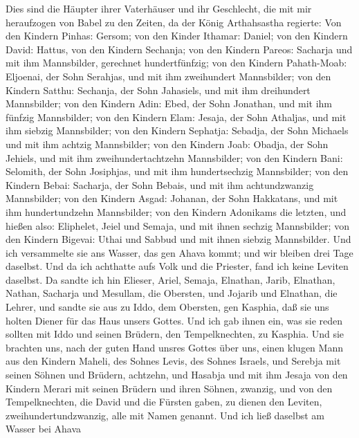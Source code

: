  Dies sind die Häupter ihrer Vaterhäuser und ihr Geschlecht,
die mit mir heraufzogen von Babel zu den Zeiten, da der König
Arthahsastha regierte:  Von den Kindern Pinhas: Gersom; von
den Kinder Ithamar: Daniel; von den Kindern David: Hattus, 
von den Kindern Sechanja; von den Kindern Pareos: Sacharja und mit ihm
Mannsbilder, gerechnet hundertfünfzig;  von den Kindern
Pahath-Moab: Eljoenai, der Sohn Serahjas, und mit ihm zweihundert
Mannsbilder;  von den Kindern Satthu: Sechanja, der Sohn
Jahasiels, und mit ihm dreihundert Mannsbilder;  von den
Kindern Adin: Ebed, der Sohn Jonathan, und mit ihm fünfzig Mannsbilder;
 von den Kindern Elam: Jesaja, der Sohn Athaljas, und mit
ihm siebzig Mannsbilder;  von den Kindern Sephatja: Sebadja,
der Sohn Michaels und mit ihm achtzig Mannsbilder;  von den
Kindern Joab: Obadja, der Sohn Jehiels, und mit ihm zweihundertachtzehn
Mannsbilder;  von den Kindern Bani: Selomith, der Sohn
Josiphjas, und mit ihm hundertsechzig Mannsbilder;  von den
Kindern Bebai: Sacharja, der Sohn Bebais, und mit ihm achtundzwanzig
Mannsbilder;  von den Kindern Asgad: Johanan, der Sohn
Hakkatans, und mit ihm hundertundzehn Mannsbilder;  von den
Kindern Adonikams die letzten, und hießen also: Eliphelet, Jeiel und
Semaja, und mit ihnen sechzig Mannsbilder;  von den Kindern
Bigevai: Uthai und Sabbud und mit ihnen siebzig Mannsbilder.
 Und ich versammelte sie ans Wasser, das gen Ahava kommt;
und wir bleiben drei Tage daselbst. Und da ich achthatte aufs Volk und
die Priester, fand ich keine Leviten daselbst.  Da sandte
ich hin Elieser, Ariel, Semaja, Elnathan, Jarib, Elnathan, Nathan,
Sacharja und Mesullam, die Obersten, und Jojarib und Elnathan, die
Lehrer,  und sandte sie aus zu Iddo, dem Obersten, gen
Kasphia, daß sie uns holten Diener für das Haus unsers Gottes. Und ich
gab ihnen ein, was sie reden sollten mit Iddo und seinen Brüdern, den
Tempelknechten, zu Kasphia.  Und sie brachten uns, nach der
guten Hand unsres Gottes über uns, einen klugen Mann aus den Kindern
Maheli, des Sohnes Levis, des Sohnes Israels, und Serebja mit seinen
Söhnen und Brüdern, achtzehn,  und Hasabja und mit ihm
Jesaja von den Kindern Merari mit seinen Brüdern und ihren Söhnen,
zwanzig,  und von den Tempelknechten, die David und die
Fürsten gaben, zu dienen den Leviten, zweihundertundzwanzig, alle mit
Namen genannt.  Und ich ließ daselbst am Wasser bei Ahava
